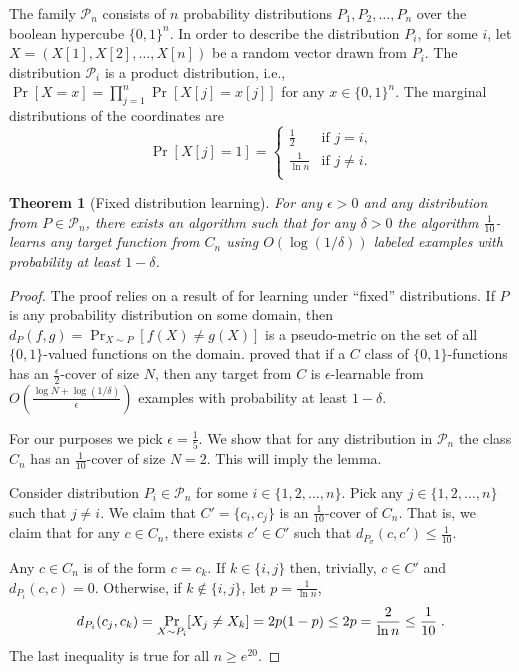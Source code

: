 \documentclass[10pt]{article}
\newtheorem{theorem}[proposition]{Theorem}
\renewcommand{\P}{\mathcal{P}}
\begin{document}
The family $\P_n$ consists of $n$ probability distributions $P_1, P_2, \dots,
P_n$ over the boolean hypercube $\{0,1\}^n$. In order to describe the
distribution $P_i$, for some $i$, let $X = (X[1], X[2], \dots, X[n])$ be a
random vector drawn from $P_i$. The distribution $\P_i$ is a product
distribution, i.e., $\Pr[X = x] = \prod_{j=1}^n \Pr[X[j] = x[j]]$ for any $x
\in \{0,1\}^n$. The marginal distributions of the coordinates are
$$
\Pr[X[j] = 1] =
\begin{cases}
\frac{1}{2} & \text{if $j = i$,} \\
\frac{1}{\ln n} & \text{if $j\neq i$.} \\
\end{cases}
$$

\begin{theorem}[Fixed distribution learning]
For any $\epsilon > 0$ and any distribution from $P \in \P_n$,
there exists an algorithm such that for any $\delta > 0$
the algorithm $\frac{1}{10}$-learns any target function
from $C_n$ using $O \left( \log(1/\delta) \right)$
labeled examples with probability at least $1 - \delta$.
\end{theorem}

\begin{proof}
The proof relies on a result of \cite{Benedek-Itai-1991} for learning under
``fixed'' distributions. If $P$ is any probability distribution on some domain,
then $d_P(f,g) = \Pr_{X \sim P}[f(X) \neq g(X)]$ is a pseudo-metric on the set of all
$\{0,1\}$-valued functions on the domain. \cite{Benedek-Itai-1991} proved that
if a $C$ class of $\{0,1\}$-functions has an $\frac{\epsilon}{2}$-cover of size
$N$, then any target from $C$ is $\epsilon$-learnable from $O
\left( \frac{\log N + \log (1/\delta)}{\epsilon}\right)$ examples
with probability at least $1-\delta$.

For our purposes we pick $\epsilon = \frac{1}{5}$. We show that for any
distribution in $\P_n$ the class $C_n$ has an $\frac{1}{10}$-cover of size $N =
2$. This will imply the lemma.

Consider distribution $P_i \in \P_n$ for some $i \in \{1,2,\dots,n\}$.
Pick any $j \in \{1,2,\dots,n\}$ such that $j \neq i$.
We claim that $C' = \{ c_i, c_j \}$ is an $\frac{1}{10}$-cover of
$C_n$. That is, we claim that for any $c \in C_n$, there exists $c' \in
C'$ such that $d_{P_{\sigma}}(c,c') \le \frac{1}{10}$.

Any $c \in C_n$ is of the form $c = c_k$. If $k \in \{i,j\}$ then, trivially, $c \in C'$ and $d_{P_i}(c,c) = 0$.
Otherwise, if  $k \not \in \{i,j\}$, let $p = \frac{1}{\ln n}$,
$$
d_{P_i}(c_j, c_k)
= \Pr_{X \sim P_i}[X_j \neq X_k] \\
= 2 p (1 - p) \\
\le 2p \\
= \frac{2}{\ln n} \\
\le \frac{1}{10} \; .
$$
The last inequality is true for all $n \ge e^{20}$.
\end{proof}
\end{document}

